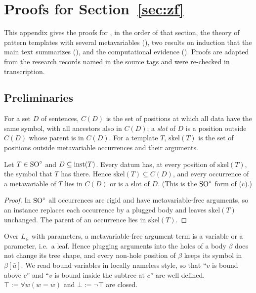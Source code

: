 \section{Proofs for Section~\ref{sec:zf}}\label{app:zf}

This appendix gives the proofs for , in the order of that section, the theory of pattern templates with
several metavariables (), two results on induction that the main text summarizes
(), and the computational evidence (). Proofs are adapted from
the research records named in the source tags and were re-checked in transcription.

\subsection{Preliminaries}\label{app:zf:prelim}

For a set $D$ of sentences, $C(D)$ is the set of positions at which all data have the same symbol, with all ancestors
also in $C(D)$; a \emph{slot} of $D$ is a position outside $C(D)$ whose parent is in $C(D)$. For a template $T$,
$\mathrm{skel}(T)$ is the set of positions outside metavariable occurrences and their arguments.

\begin{lemma}\label{lem:zf:rigid}
Let $T\in\mathrm{SO}^{\circ}$ and $D\subseteq\mathrm{inst}(T)$. Every datum has, at every position of $\mathrm{skel}(T)$, the symbol that $T$
has there. Hence $\mathrm{skel}(T)\subseteq C(D)$, and every occurrence of a metavariable of $T$ lies in $C(D)$ or is a
slot of $D$. (This is the $\mathrm{SO}^{\circ}$ form of (c).)
\end{lemma}
\begin{proof}
In $\mathrm{SO}^{\circ}$ all occurrences are rigid and have metavariable-free arguments, so an instance replaces each occurrence by a
plugged body and leaves $\mathrm{skel}(T)$ unchanged. The parent of an occurrence lies in $\mathrm{skel}(T)$.
\end{proof}

Over $L_\in$ with parameters, a metavariable-free argument term is a variable or a parameter, i.e.\ a leaf. Hence
plugging arguments into the holes of a body $\beta$ does not change its tree shape, and every non-hole position of
$\beta$ keeps its symbol in $\beta[\bar u]$. We read bound variables in locally nameless style, so that ``$v$ is bound
above $c$'' and ``$v$ is bound inside the subtree at $c$'' are well defined. $\top:=\forall w(w=w)$ and $\bot:=\neg\top$
are closed.

